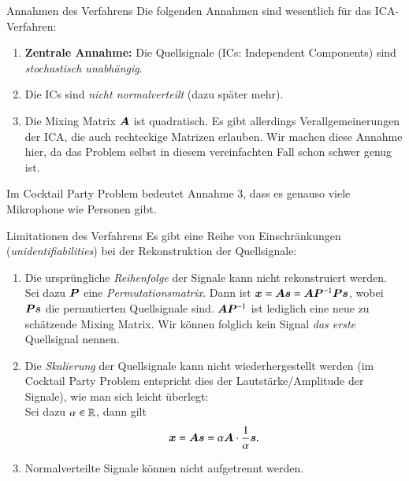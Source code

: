 \begin{frame}{Annahmen des Verfahrens}{}
	Die folgenden Annahmen sind wesentlich für das ICA-Verfahren:

	\begin{enumerate}
		\item \textbf{Zentrale Annahme:} Die Quellsignale (ICs: Independent Components) sind
			\textit{stochastisch unabhängig}.
		\item Die ICs sind \textit{nicht normalverteilt} (dazu später mehr).
		\item Die Mixing Matrix $\bm{A}$ ist quadratisch. Es gibt allerdings Verallgemeinerungen der ICA,
			die auch rechteckige Matrizen erlauben. Wir machen diese Annahme hier,
			da das Problem selbst in diesem vereinfachten Fall schon schwer genug ist.
	\end{enumerate}
	
	Im Cocktail Party Problem bedeutet Annahme 3, dass es genauso viele Mikrophone wie Personen gibt.
\end{frame}


\begin{frame}{Limitationen des Verfahrens}{}
	Es gibt eine Reihe von Einschränkungen (\textit{unidentifiabilities}) bei der Rekonstruktion der Quellsignale:

	\begin{enumerate}
		\item Die ursprüngliche \textit{Reihenfolge} der Signale kann nicht rekonstruiert werden.
			Sei dazu $\bm{P}$ eine \textit{Permutationsmatrix}. Dann ist
			$\bm{x} = \bm{A} \bm{s} = \bm{A} \bm{P}^{-1} \bm{P} \bm{s}$, wobei $\bm{P} \bm{s}$ die permutierten Quellsignale sind.
			$\bm{A} \bm{P}^{-1}$ ist lediglich eine neue zu schätzende Mixing Matrix.
			Wir können folglich kein Signal \textit{das erste} Quellsignal nennen.
		\item Die \textit{Skalierung} der Quellsignale kann nicht wiederhergestellt werden
			(im Cocktail Party Problem entspricht dies der Lautstärke/Amplitude der Signale), wie man sich leicht überlegt: \\
			Sei dazu $\alpha \in \mathbb{R}$, dann gilt $$\bm{x} = \bm{A} \bm{s} = \alpha \bm{A} \cdot \frac{1}{\alpha} \bm{s}.$$
		\item Normalverteilte Signale können nicht aufgetrennt werden.
	\end{enumerate}
\end{frame}


